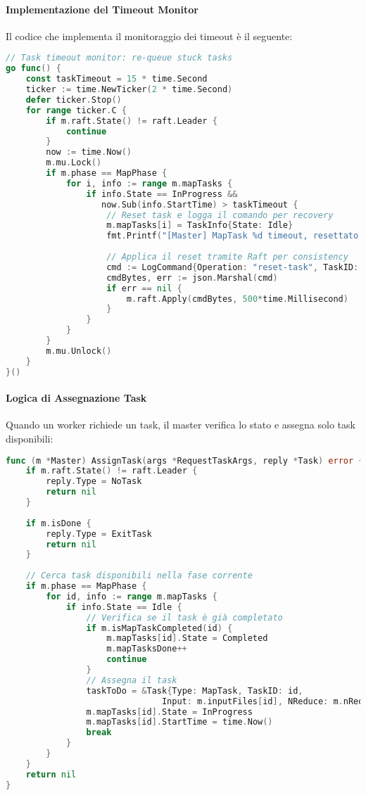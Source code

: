 \documentclass[12pt,a4paper]{article}
\begin{document}
\paragraph{Implementazione del Timeout Monitor}
Il codice che implementa il monitoraggio dei timeout è il seguente:

\begin{lstlisting}[language=go, caption=Task Timeout Monitor in src/master.go]
// Task timeout monitor: re-queue stuck tasks
go func() {
    const taskTimeout = 15 * time.Second
    ticker := time.NewTicker(2 * time.Second)
    defer ticker.Stop()
    for range ticker.C {
        if m.raft.State() != raft.Leader {
            continue
        }
        now := time.Now()
        m.mu.Lock()
        if m.phase == MapPhase {
            for i, info := range m.mapTasks {
                if info.State == InProgress && 
                   now.Sub(info.StartTime) > taskTimeout {
                    // Reset task e logga il comando per recovery
                    m.mapTasks[i] = TaskInfo{State: Idle}
                    fmt.Printf("[Master] MapTask %d timeout, resettato a Idle\n", i)
                    
                    // Applica il reset tramite Raft per consistency
                    cmd := LogCommand{Operation: "reset-task", TaskID: i}
                    cmdBytes, err := json.Marshal(cmd)
                    if err == nil {
                        m.raft.Apply(cmdBytes, 500*time.Millisecond)
                    }
                }
            }
        }
        m.mu.Unlock()
    }
}()
\end{lstlisting}

\paragraph{Logica di Assegnazione Task}
Quando un worker richiede un task, il master verifica lo stato e assegna solo task disponibili:

\begin{lstlisting}[language=go, caption=Assegnazione Task in src/master.go]
func (m *Master) AssignTask(args *RequestTaskArgs, reply *Task) error {
    if m.raft.State() != raft.Leader {
        reply.Type = NoTask
        return nil
    }
    
    if m.isDone {
        reply.Type = ExitTask
        return nil
    }
    
    // Cerca task disponibili nella fase corrente
    if m.phase == MapPhase {
        for id, info := range m.mapTasks {
            if info.State == Idle {
                // Verifica se il task è già completato
                if m.isMapTaskCompleted(id) {
                    m.mapTasks[id].State = Completed
                    m.mapTasksDone++
                    continue
                }
                // Assegna il task
                taskToDo = &Task{Type: MapTask, TaskID: id, 
                               Input: m.inputFiles[id], NReduce: m.nReduce}
                m.mapTasks[id].State = InProgress
                m.mapTasks[id].StartTime = time.Now()
                break
            }
        }
    }
    return nil
}
\end{lstlisting}
\end{document}
